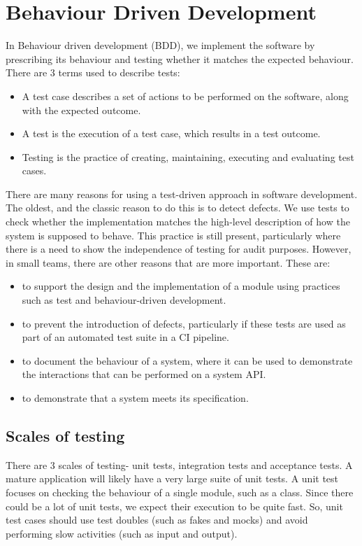 \documentclass[a4paper, openany]{memoir}
\begin{document}
\chapter{Behaviour Driven Development}
In Behaviour driven development (BDD), we implement the software by prescribing its behaviour and testing whether it matches the expected behaviour. There are 3 terms used to describe tests:
\begin{itemize}
    \item A test case describes a set of actions to be performed on the software, along with the expected outcome.
    \item A test is the execution of a test case, which results in a test outcome.
    \item Testing is the practice of creating, maintaining, executing and evaluating test cases.
\end{itemize}

There are many reasons for using a test-driven approach in software development. The oldest, and the classic reason to do this is to detect defects. We use tests to check whether the implementation matches the high-level description of how the system is supposed to behave. This practice is still present, particularly where there is a need to show the independence of testing for audit purposes. However, in small teams, there are other reasons that are more important. These are:
\begin{itemize}
    \item to support the design and the implementation of a module using practices such as test and behaviour-driven development.
    
    \item to prevent the introduction of defects, particularly if these tests are used as part of an automated test suite in a CI pipeline.
    
    \item to document the behaviour of a system, where it can be used to demonstrate the interactions that can be performed on a system API.
    
    \item to demonstrate that a system meets its specification.
\end{itemize}

\section{Scales of testing}
There are 3 scales of testing- unit tests, integration tests and acceptance tests. A mature application will likely have a very large suite of unit tests. A unit test focuses on checking the behaviour of a single module, such as a class. Since there could be a lot of unit tests, we expect their execution to be quite fast. So, unit test cases should use test doubles (such as fakes and mocks) and avoid performing slow activities (such as input and output).
\end{document}
